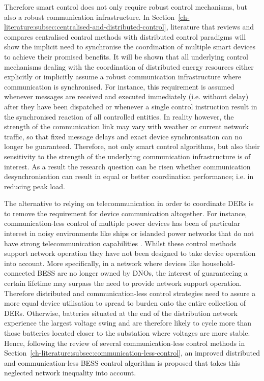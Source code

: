 Therefore smart control does not only require robust control mechanisms, but also a robust communication infrastructure.
In Section~\ref{ch-literature:subsec:centralised-and-distributed-control}, literature that reviews and compares centralised control methods with distributed control paradigms will show the implicit need to synchronise the coordination of multiple smart devices to achieve their promised benefits.
It will be shown that all underlying control mechanisms dealing with the coordination of distributed energy resources either explicitly or implicitly assume a robust communication infrastructure where communication is synchronised.
For instance, this requirement is assumed whenever messages are received and executed immediately (i.e. without delay) after they have been dispatched or whenever a single control instruction result in the synchronised reaction of all controlled entities.
In reality however, the strength of the communication link may vary with weather or current network traffic, so that fixed message delays and exact device synchronisation can no longer be guaranteed.
Therefore, not only smart control algorithms, but also their sensitivity to the strength of the underlying communication infrastructure is of interest.
As a result the research question can be risen whether communication desynchronisation can result in equal or better coordination performance; i.e. in reducing peak load.

The alternative to relying on telecommunication in order to coordinate DERs is to remove the requirement for device communication altogether.
For instance, communication-less control of multiple power devices has been of particular interest in noisy environments like ships \cite{Baldwin2004} or islanded power networks that do not have strong telecommunication capabilities \cite{Diaz2017}.
Whilst these control methods support network operation they have not been designed to take device operation into account.
More specifically, in a network where devices like household-connected BESS are no longer owned by DNOs, the interest of guaranteeing a certain lifetime may surpass the need to provide network support operation.
Therefore distributed and communication-less control strategies need to assure a more equal device utilisation to spread to burden onto the entire collection of DERs.
Otherwise, batteries situated at the end of the distribution network experience the largest voltage swing and are therefore likely to cycle more than those batteries located closer to the substation where voltages are more stable.
Hence, following the review of several communication-less control methods in Section~\ref{ch-literature:subsec:communication-less-control}, an improved distributed and communication-less BESS control algorithm is proposed that takes this neglected network inequality into account.
